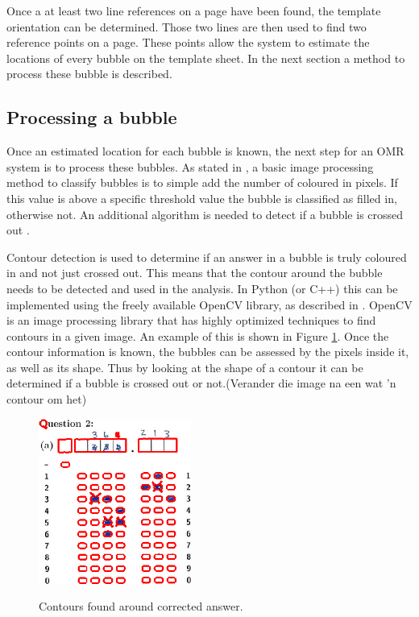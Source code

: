 Once a at least two line references on a page have been found, the template orientation can be determined. Those two lines are then used to find two reference points on a page. These points allow the system to estimate the locations of every bubble on the template sheet. In the next section a method to process these bubble is described.

\subsection{Processing a bubble}

Once an estimated location for each bubble is known, the next step for an OMR system is to process these bubbles. As stated in \citet{MVGI2015}, a basic image processing method to classify bubbles is to simple add the number of coloured in pixels. If this value is above a specific threshold value the bubble is classified as filled in, otherwise not. An additional algorithm is needed to detect if a bubble is crossed out .

Contour detection is used to determine if an answer in a bubble is truly coloured in and not just crossed out. This means that the contour around the bubble needs to be detected and used in the analysis. In Python (or C++) this can be implemented using the freely available OpenCV library, as described in \citet{AdrianR2016}. OpenCV is an image processing library that has highly optimized techniques to find contours in a given image. An example of this is shown in Figure \ref{fig:Cross}. Once the contour information is known, the bubbles can be assessed by the pixels inside it, as well as its shape. Thus by looking at the shape of a contour it can be determined if a bubble is crossed out or not.(Verander die image na een wat 'n contour om het)
\begin{figure}
  \centering
  \includegraphics[width=5cm]{Cross}\\
  \caption{Contours found around corrected answer.}
  \label{fig:Cross}
\end{figure}


